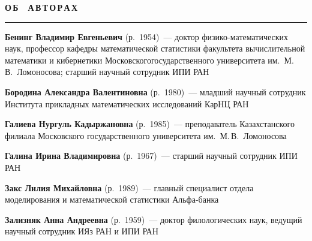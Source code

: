 \def\stat{authorsrus}
{%
\raggedleft\Large \bf%
О\,Б\ \ А\,В\,Т\,О\,Р\,А\,Х \vskip 17pt
    \hrule
    \par
{} }

\label{st\stat}


\def\leftkol{\ } %
\def\rightkol{ОБ АВТОРАХ} %



\vspace*{36pt}

\begin{multicols}{2}

\noindent
\textbf{Бенинг Владимир Евгеньевич} (р.\ 1954)~--- доктор фи\-зи\-ко-ма\-те\-ма\-ти\-че\-ских 
наук, профессор кафедры математической статистики факультета вычислительной математики и 
кибернетики Московского\linebreak государственного университета им.\ М.\,В.~Ломоносова; 
старший научный сотрудник ИПИ РАН 

\vspace*{4pt}

\noindent
\textbf{Бородина Александра Валентиновна} (р.\ 1980)~--- младший научный сотрудник Института 
прикладных математических исследований КарНЦ РАН

\vspace*{4pt}

\noindent
\textbf{Галиева Нургуль Кадыржановна} (р.\ 1985)~--- преподаватель Казахстанского 
филиала Московского государственного университета им.\ М.\,В.~Ломоносова

\vspace*{4pt}

\noindent
\textbf{Галина Ирина Владимировна} (р.\ 1967)~--- старший научный сотрудник ИПИ РАН

\vspace*{4pt}

\noindent
\textbf{Закс Лилия Михайловна} (р.\ 1989)~--- главный специалист отдела моделирования 
и математической статистики Альфа-банка

\vspace*{4pt}

\noindent
\textbf{Зализняк Анна Андреевна} (р.\ 1959)~--- доктор филологических наук, 
ведущий научный сотрудник ИЯз РАН и ИПИ РАН

\vspace*{4pt}


\end{multicols}
